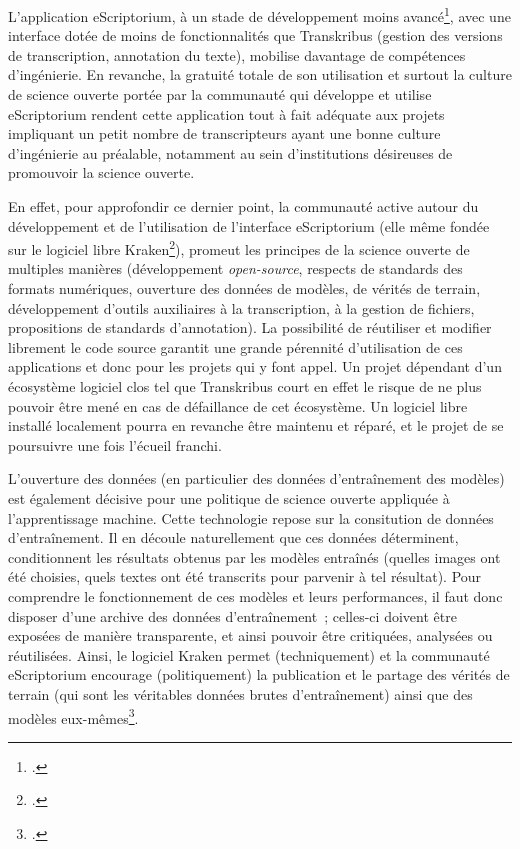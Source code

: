 \documentclass[a4paper,12pt,twoside]{book}
\begin{document}
				L'application eScriptorium, à un stade de développement moins avancé\footcite{stokesEScriptoriumVREManuscript2021}, avec une interface dotée de moins de fonctionnalités que Transkribus (gestion des versions de transcription, annotation du texte), mobilise davantage de compétences d'ingénierie. En revanche, la gratuité totale de son utilisation et surtout la culture de science ouverte portée par la communauté qui développe et utilise eScriptorium rendent cette application tout à fait adéquate aux projets impliquant un petit nombre de transcripteurs ayant une bonne culture d'ingénierie au préalable, notamment au sein d'institutions désireuses de promouvoir la science ouverte.
				
				En effet, pour approfondir ce dernier point, la communauté active autour du développement et de l'utilisation de l'interface eScriptorium (elle même fondée sur le logiciel libre Kraken\footcite{KrakenDocumentation}), promeut les principes de la science ouverte de multiples manières (développement \textit{open-source}, respects de standards des formats numériques, ouverture des données de modèles, de vérités de terrain, développement d'outils auxiliaires à la transcription, à la gestion de fichiers, propositions de standards d'annotation). La possibilité de réutiliser et modifier librement le code source garantit une grande pérennité d'utilisation de ces applications et donc pour les projets qui y font appel. Un projet dépendant d'un écosystème logiciel clos tel que Transkribus court en effet le risque de ne plus pouvoir être mené en cas de défaillance de cet écosystème. Un logiciel libre installé localement pourra en revanche être maintenu et réparé, et le projet de se poursuivre une fois l'écueil franchi.
				
				L'ouverture des données (en particulier des données d'entraînement des modèles) est également décisive pour une politique de science ouverte appliquée à l'apprentissage machine. Cette technologie repose sur la consitution de données d'entraînement. Il en découle naturellement que ces données déterminent, conditionnent les résultats obtenus par les modèles entraînés (quelles images ont été choisies, quels textes ont été transcrits pour parvenir à tel résultat). Pour comprendre le fonctionnement de ces modèles et leurs performances, il faut donc disposer d'une archive des données d'entraînement~; celles-ci doivent être exposées de manière transparente, et ainsi pouvoir être critiquées, analysées ou réutilisées. Ainsi, le logiciel Kraken permet (techniquement) et la communauté eScriptorium encourage (politiquement) la publication et le partage des vérités de terrain (qui sont les véritables données brutes d'entraînement) ainsi que des modèles eux-mêmes\footcite{chagueHTRUnitedMutualisonsVerite2021}.
				
\end{document}
